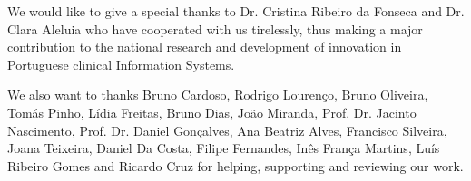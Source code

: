 We would like to give a special thanks to Dr. Cristina Ribeiro da Fonseca and Dr. Clara Aleluia who have cooperated with us tirelessly, thus making a major contribution to the national research and development of innovation in Portuguese clinical Information Systems.

We also want to thanks Bruno Cardoso, Rodrigo Louren\c{c}o, Bruno Oliveira, Tom\'{a}s Pinho, L\'{i}dia Freitas, Bruno Dias, Jo\~{a}o Miranda, Prof. Dr. Jacinto Nascimento, Prof. Dr. Daniel Gon\c{c}alves, Ana Beatriz Alves, Francisco Silveira, Joana Teixeira, Daniel Da Costa, Filipe Fernandes, In\^{e}s Fran\c{c}a Martins, Lu\'{i}s Ribeiro Gomes and Ricardo Cruz for helping, supporting and reviewing our work.

\clearpage

\printbibliography


